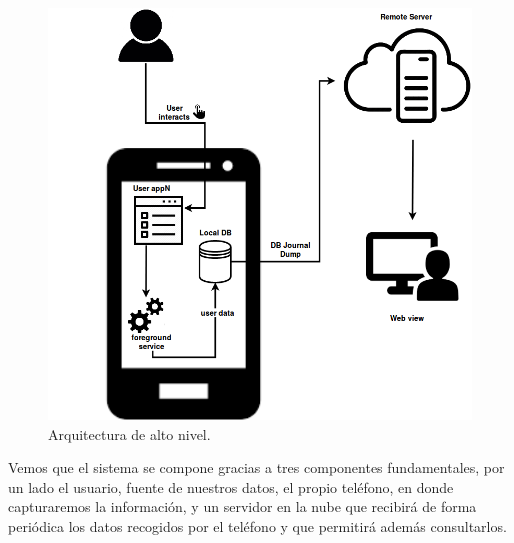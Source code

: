 \documentclass[12pt,a4paper,oneside]{book} %
\begin{document}
\begin{figure}[H]
  \begin{center}
     \includegraphics[width=1\textwidth]{pictures/architecture/highLevel/altonivel01.png}
  \end{center}
  \caption[Arquitectura de alto nivel]{Arquitectura de alto nivel.}
  \label{fig:LandscapeFigure}
\end{figure}

\newpage
Vemos que el sistema se compone gracias a tres componentes fundamentales, por un lado el usuario, fuente de nuestros datos, el propio teléfono, en donde capturaremos la información, y un servidor en la nube que recibirá de forma periódica los datos recogidos por el teléfono y que permitirá además consultarlos. 
\newline
\newline
\end{document}
